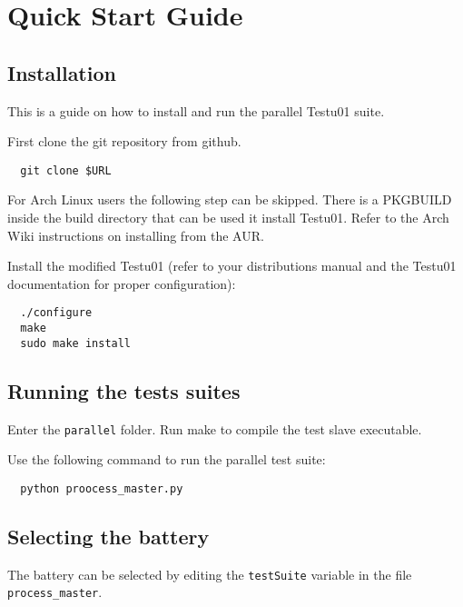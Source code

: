 \chapter{Quick Start Guide}
\section{Installation}
This is a guide on how to install and run the parallel Testu01 suite.

First clone the git repository from github\cite{github-repo}.
\begin{verbatim}
  git clone $URL
\end{verbatim}

For Arch Linux users the following step can be skipped. There is a PKGBUILD inside the build directory that can be used it install Testu01.
Refer to the Arch Wiki instructions on installing from the AUR.

Install the modified Testu01 (refer to your distributions manual and the Testu01 documentation for proper configuration):
\begin{verbatim}
  ./configure
  make
  sudo make install 
\end{verbatim}

\section{Running the tests suites}
Enter the \texttt{parallel} folder. Run make to compile the test slave executable.


Use the following command to run the parallel test suite:
\begin{verbatim}
  python proocess_master.py
\end{verbatim}

\section{Selecting the battery}
The battery can be selected by editing the \texttt{testSuite} variable in the file \texttt{process\_master}.
